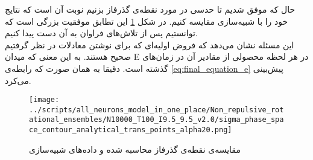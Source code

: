 حال که موفق شدیم تا حدسی در مورد نقطه‌ی گذرفاز بزنیم نوبت آن است که نتایج خود را با شبیه‌سازی مقایسه کنیم. در شکل
\ref{fig:non_repulsive_trans_point}
این تطابق موفقیت بزرگی است که توانستیم پس از تلاش‌های فراوان به آن دست پیدا کنیم.
\\
این مسئله نشان می‌دهد که فروض اولیه‌ای که برای نوشتن معادلات در نظر گرفتیم صحیح هستند. به این معنی که میدان E در هر لحظه محصولی از مقادیر آن در زمان‌های گذشته است. دقیقا به همان صورت که رابطه‌ی 
\ref{eq:final_equation_e}
پیش‌بینی می‌کرد.
\begin{figure}
	\texttt{[image: ../scripts/all\_neurons\_model\_in\_one\_place/Non\_repulsive\_rotational\_ensembles/N10000\_T100\_I9.5\_9.5\_v2.0/sigma\_phase\_space\_contour\_analytical\_trans\_points\_alpha20.png]}
	\caption{مقایسه‌ی نقطه‌ی گذرفاز محاسبه شده و داده‌های شبیه‌سازی}
	\label{fig:non_repulsive_trans_point}
\end{figure}







